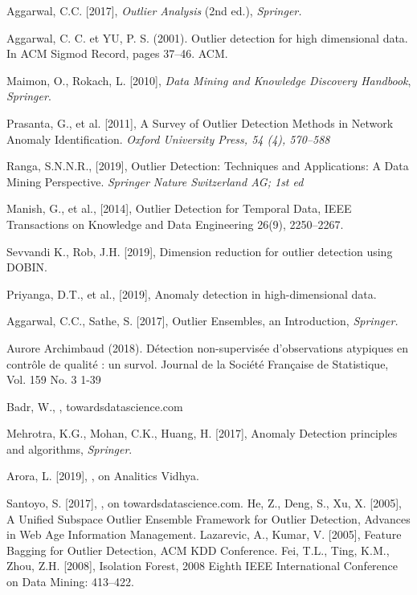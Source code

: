 \begin{thebibliography}{99}

 Aggarwal, C.C. [2017],  \textit{Outlier Analysis} (2nd ed.), {\it Springer.} 

 Aggarwal, C. C. et YU, P. S. (2001). Outlier detection for high dimensional data. In ACM Sigmod Record, pages 37–46. ACM.

 Maimon, O.,  Rokach, L. [2010], \textit{Data Mining and Knowledge Discovery Handbook}, {\it Springer}. 

 Prasanta, G., et al. [2011], A Survey of Outlier Detection Methods in Network Anomaly Identification. {\it Oxford University Press, 54 (4), 570--588}

 Ranga, S.N.N.R., [2019], Outlier Detection: Techniques and Applications: A Data Mining Perspective. {\it Springer Nature Switzerland AG; 1st ed}

 Manish, G., et al., [2014], Outlier Detection for Temporal Data, IEEE Transactions on Knowledge and Data Engineering 26(9), 2250–2267.

 Sevvandi K., Rob, J.H. [2019], Dimension reduction for outlier detection using DOBIN.

 Priyanga, D.T., et al., [2019],  Anomaly detection in high-dimensional data.

 Aggarwal, C.C., Sathe, S. [2017], Outlier Ensembles, an Introduction, {\it Springer.}

 Aurore Archimbaud (2018). Détection non-supervisée d’observations
atypiques en contrôle de qualité : un survol. Journal de la Société Française de Statistique, Vol. 159 No. 3 1-39


 Badr, W., , towardsdatascience.com 

 Mehrotra, K.G., Mohan, C.K., Huang, H. [2017],  Anomaly Detection principles and algorithms, {\it Springer}. 

  Arora, L. [2019], , on Analitics Vidhya. 

 Santoyo, S. [2017], , on towardsdatascience.com.
 He, Z., Deng, S., Xu, X. [2005], A Unified Subspace Outlier Ensemble Framework for Outlier Detection, Advances in Web Age Information Management.
 Lazarevic, A., Kumar, V. [2005], Feature Bagging for Outlier Detection, ACM KDD Conference.
 Fei, T.L., Ting, K.M., Zhou, Z.H. [2008], Isolation Forest, 2008 Eighth IEEE International Conference on Data Mining: 413–422.


\end{thebibliography}
